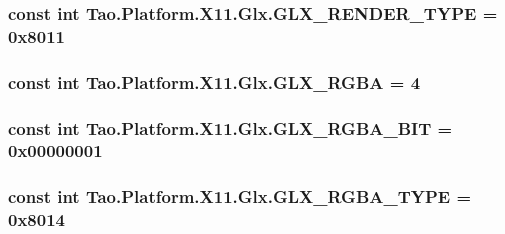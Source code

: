 \label{class_tao_1_1_platform_1_1_x11_1_1_glx_a033dbf660bd6df8f09dba42972b69a0b}
\hypertarget{class_tao_1_1_platform_1_1_x11_1_1_glx_a34fd97e1e32bc93a6fb58867f3d14879}{
\subsubsection[{GLX\_\-RENDER\_\-TYPE}]{\setlength{\rightskip}{0pt plus 5cm}const int {\bf Tao.Platform.X11.Glx.GLX\_\-RENDER\_\-TYPE} = 0x8011}}
\label{class_tao_1_1_platform_1_1_x11_1_1_glx_a34fd97e1e32bc93a6fb58867f3d14879}
\hypertarget{class_tao_1_1_platform_1_1_x11_1_1_glx_ac7d84613555c5152e3ce4f4999a5d8e5}{
\subsubsection[{GLX\_\-RGBA}]{\setlength{\rightskip}{0pt plus 5cm}const int {\bf Tao.Platform.X11.Glx.GLX\_\-RGBA} = 4}}
\label{class_tao_1_1_platform_1_1_x11_1_1_glx_ac7d84613555c5152e3ce4f4999a5d8e5}
\hypertarget{class_tao_1_1_platform_1_1_x11_1_1_glx_a46959909212bb7c1157ce812e621f2f6}{
\subsubsection[{GLX\_\-RGBA\_\-BIT}]{\setlength{\rightskip}{0pt plus 5cm}const int {\bf Tao.Platform.X11.Glx.GLX\_\-RGBA\_\-BIT} = 0x00000001}}
\label{class_tao_1_1_platform_1_1_x11_1_1_glx_a46959909212bb7c1157ce812e621f2f6}
\hypertarget{class_tao_1_1_platform_1_1_x11_1_1_glx_a9d98f89beff5043030c657aa94352647}{
\subsubsection[{GLX\_\-RGBA\_\-TYPE}]{\setlength{\rightskip}{0pt plus 5cm}const int {\bf Tao.Platform.X11.Glx.GLX\_\-RGBA\_\-TYPE} = 0x8014}}
